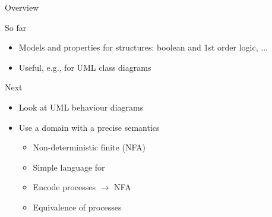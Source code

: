\documentclass[aspectratio=169]{beamer}
\begin{document}
\begin{slide}{Overview}
\begin{block}{So far}
\begin{itemize}
  \item Models and properties for \alert{structures}: boolean and 1st order logic, ...
  \item Useful, e.g., for UML class diagrams
\end{itemize}
\end{block}

\vspace*{-3mm}
\begin{block}{Next}
\begin{itemize}
  \item Look at UML \alert{behaviour} diagrams
  \item Use a domain with a \alert{precise semantics}
  \begin{itemize}
    \item Non-deterministic finite  (NFA)
    \item Simple language for 
    \item Encode processes $\to$ NFA
    \item Equivalence of processes
  \end{itemize}
\end{itemize}
\end{block}

~~

\end{slide}
\end{document}
